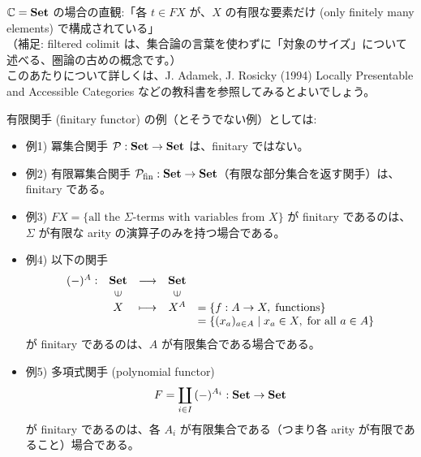 \documentclass[
		head_space=20mm,
		foot_space=20mm,
		gutter=10mm,
		line_length=190mm
]{jlreq}
\begin{document}
\noindent $\mathbb{C}=\mathbf{Set}$ の場合の直観:「各 $t\in FX$ が、$X$ の有限な要素だけ (only finitely many elements) で構成されている」\\ （補足: filtered colimit は、集合論の言葉を使わずに「対象のサイズ」について述べる、圏論の古めの概念です。）\vspace{8pt}\\このあたりについて詳しくは、J. Adamek, J. Rosicky (1994) Locally Presentable and Accessible Categories などの教科書を参照してみるとよいでしょう。%
\vspace{8pt}

\noindent 有限関手 (finitary functor) の例（とそうでない例）としては:
\begin{itemize}
	\item 例1) 冪集合関手 $\mathcal P:\mathbf{Set}\to\mathbf{Set}$ は、finitary ではない。
	\item 例2) 有限冪集合関手 $\mathcal P_{\mathrm{fin}}:\mathbf{Set}\to\mathbf{Set}$（有限な部分集合を返す関手）は、finitary である。
	\item 例3) $FX=\{\textrm{all the $\Sigma$-terms with variables from $X$}\}$ が finitary であるのは、$\Sigma$ が有限な arity の演算子のみを持つ場合である。
	\item 例4) 以下の関手\[\begin{array}{ccccl}(-)^A:&\Set&\longrightarrow&\Set\\{}&\rotatebox{90}{$\in$}&{}&\rotatebox{90}{$\in$}\\{}&X&\longmapsto&X^A&=\{f:A\to X,\;\textrm{functions}\}\\{}&{}&{}&{}&=\{(x_a)_{a\in A}\mid x_a\in X,\;\textrm{for all $a\in A$}\}\end{array}\] が finitary であるのは、$A$ が有限集合である場合である。
	\item 例5) 多項式関手 (polynomial functor) \[F=\coprod_{i\in I}\,(-)^{A_i}:\mathbf{Set}\to\mathbf{Set}\] が finitary であるのは、各 $A_i$ が有限集合である（つまり各 arity が有限であること）場合である。
\end{itemize}



\end{document}
